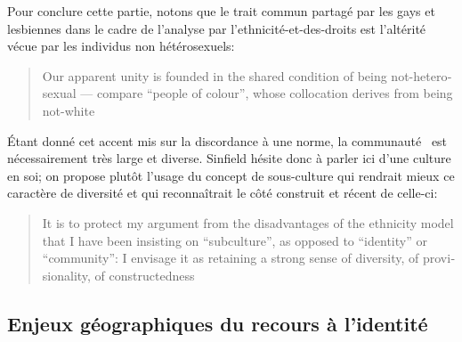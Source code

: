 Pour conclure cette partie, notons que le trait commun partagé par les gays et lesbiennes dans le cadre de l'analyse par l'ethnicité-et-des-droits est l'altérité vécue par les individus non hétérosexuels: \foreignblockquote{english}[{\cite[289]{Sinfield1996}}][.]{Our apparent unity is founded in the shared condition of being not-heterosexual --- compare \enquote{people of colour}, whose collocation derives from being not-white}.
Étant donné cet accent mis sur la discordance à une norme, la communauté \lgbt\ est nécessairement très large et diverse.
Sinfield hésite donc à parler ici d'une culture en soi; on propose plutôt l'usage du concept de sous-culture qui rendrait mieux ce caractère de diversité et qui reconnaîtrait le côté construit et récent de celle-ci:
\foreignblockquote{english}[{\cite[289]{Sinfield1996}}][.]{It is to protect my argument from the disadvantages of the ethnicity model that I have been insisting on \enquote{subculture}, as opposed to \enquote{identity} or \enquote{community}: I envisage it as retaining a strong sense of diversity, of provisionality, of constructedness}.


\subsection{Enjeux géographiques du recours à l'identité}
\label{sub:enjeux_g_ographiques_du_recours_l_identit_}


